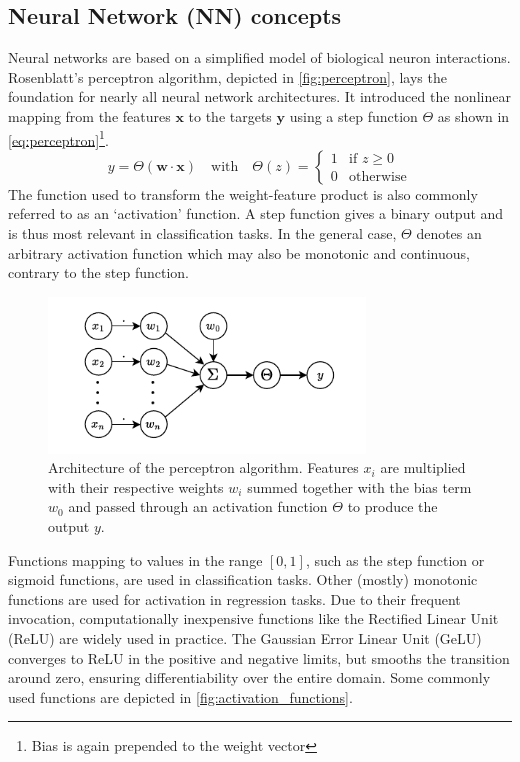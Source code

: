 \subsection{Neural Network (NN) concepts}
\label{subsec:nn_concepts}
Neural networks are based on a simplified model of biological neuron interactions. Rosenblatt's perceptron algorithm, depicted in \autoref{fig:perceptron}, lays the foundation for nearly all neural network architectures. \parencite{ref:rosenblatt1958perceptron} It introduced the nonlinear mapping from the features $\mathbf{x}$ to the targets $\mathbf{y}$ using a step function $\Theta$ as shown in \autoref{eq:perceptron}\footnote{Bias is again prepended to the weight vector}.
\begin{equation}
    \label{eq:perceptron}
    y = \Theta(\mathbf{w} \cdot \mathbf{x}) \quad \text{with} \quad
    \Theta(z) =
    \begin{cases}
        1 & \text{if } z \geq 0 \\
        0 & \text{otherwise}
    \end{cases}
\end{equation}
The function used to transform the weight-feature product is also commonly referred to as an `activation' function. A step function gives a binary output and is thus most relevant in classification tasks. In the general case, $\Theta$ denotes an arbitrary activation function which may also be monotonic and continuous, contrary to the step function.\\
\begin{figure}[H]
    \centering
    \includegraphics[width=0.75\textwidth]{../fig/background/Perceptron.pdf}
    \caption[Perceptron]{Architecture of the perceptron algorithm. Features $x_i$ are multiplied with their respective weights $w_i$ summed together with the bias term $w_0$ and passed through an activation function $\Theta$ to produce the output $y$.}
    \label{fig:perceptron}
\end{figure}
Functions mapping to values in the range $[0, 1]$, such as the step function or sigmoid functions, are used in classification tasks. Other (mostly) monotonic functions are used for activation in regression tasks. Due to their frequent invocation, computationally inexpensive functions like the Rectified Linear Unit (ReLU) are widely used in practice. The Gaussian Error Linear Unit (GeLU) converges to ReLU in the positive and negative limits, but smooths the transition around zero, ensuring differentiability over the entire domain. Some commonly used functions are depicted in \autoref{fig:activation_functions}. 
